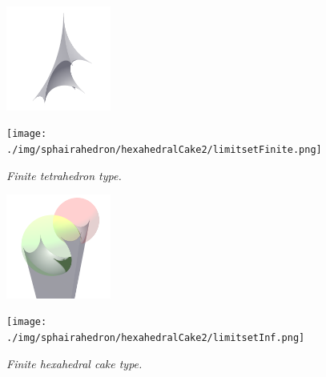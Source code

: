 \documentclass[dvipdfmx]{interact}
\theoremstyle{plain}%
\theoremstyle{definition}
\theoremstyle{remark}
\theoremstyle{problemstyle}
\begin{document}
\begin{figure}[H]
 \begin{minipage}{0.5\textwidth}
  \begin{minipage}[t]{0.24\textwidth}
   \centering
   \includegraphics[width=1.35in, height=1.35in,
   keepaspectratio]{./img/sphairahedron/hexahedralCake2/sphairahedronFinite.png}
  \end{minipage}
  \hspace*{\fill}
  \begin{minipage}[t]{0.24\textwidth}
   \centering
   \texttt{[image: ./img/sphairahedron/hexahedralCake2/limitsetFinite.png]}
  \end{minipage}
  \hspace*{\fill}
  \caption{\textit{Finite tetrahedron type.}}
  \label{fig:cakeFinite}
 \end{minipage}
 \hspace*{\fill}
 \begin{minipage}{0.5\textwidth}
  \begin{minipage}[t]{0.24\textwidth}
   \centering
   \includegraphics[width=1.35in, height=1.35in,
   keepaspectratio]{./img/sphairahedron/hexahedralCake2/sphairahedronInf.png}
  \end{minipage}
  \hspace*{\fill}
  \begin{minipage}[t]{0.24\textwidth}
   \centering
   \texttt{[image: ./img/sphairahedron/hexahedralCake2/limitsetInf.png]} 
  \end{minipage}
  \hspace*{\fill}
  \caption{\textit{Finite hexahedral cake type.}}
  \label{fig:cakeInf}
 \end{minipage}
\end{figure}
\end{document}
